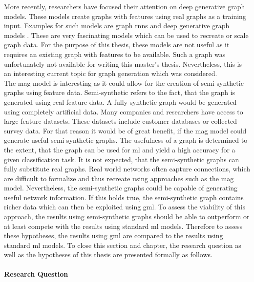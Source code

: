 	\noindent More recently, researchers have focused their attention on deep 
	generative graph models. These models create graphs with features using
	real graphs as a training input. Examples for such models are graph
	\aclp{rnn} \citep{you2018graphrnn} and deep generative graph
	models \citep{li2018learning}. These are very fascinating models which can
	be used to recreate or scale graph data. For the purpose of this thesis,
	these models are not useful as it requires an existing graph with
	features to be available. Such a graph was unfortunately not available for
	writing this master's thesis. Nevertheless, this is an interesting current 
	topic for graph generation which was considered. \\ 

	\noindent The \acs{mag} model is interesting as it could allow for the 
	creation of semi-synthetic graphs using feature data. Semi-synthetic refers
	to the fact, that the graph is generated using real feature data. A fully
	synthetic graph would be generated using completely artificial data. Many
	companies and researchers have access to large feature datasets. These
	datasets include customer databases or collected survey data. For that
	reason it would be of great benefit, if the \acs{mag} model could generate
	useful semi-synthetic graphs. The usefulness of a graph is determined to
	the extent, that the graph can be used for \acs{ml} and yield a high 
	accuracy for a given classification task. It is not expected, that the 
	semi-synthetic graphs can fully substitute real graphs. Real world networks
	often capture connections, which are difficult to formalize and thus
	recreate using approaches such as the \acs{mag} model. Nevertheless, the
	semi-synthetic graphs could be capable of generating useful network
	information. If this holds true, the semi-synthetic graph contains richer
	data which can then be exploited using \acs{gml}. To assess
	the viability of this approach, the results using semi-synthetic graphs
	should be able to outperform or at least compete with the results using
	standard \acs{ml} models. Therefore to assess these hypotheses, the results 
	using \acs{gml} are compared to the results using standard \acs{ml} models. 
	To close this section and chapter, the research question as well as the 
	hypotheses of this thesis are presented formally as follows.

	\paragraph{Research Question}\mbox{}

